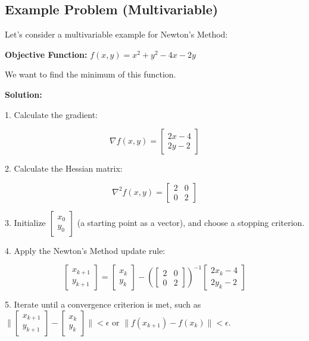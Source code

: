 \documentclass[a4paper]{article}
\begin{document}
\subsection{Example Problem (Multivariable)}

Let's consider a multivariable example for Newton's Method:

\textbf{Objective Function:} $f(x, y) = x^2 + y^2 - 4x - 2y$

We want to find the minimum of this function.

\textbf{Solution:}

1. Calculate the gradient:

\[
\nabla f(x, y) = \begin{bmatrix}
2x - 4 \\
2y - 2
\end{bmatrix}
\]

2. Calculate the Hessian matrix:

\[
\nabla^2 f(x, y) = \begin{bmatrix}
2 & 0 \\
0 & 2
\end{bmatrix}
\]

3. Initialize $\begin{bmatrix} x_0 \\ y_0 \end{bmatrix}$ (a starting point as a vector), and choose a stopping criterion.

4. Apply the Newton's Method update rule:

\[
\begin{bmatrix} x_{k+1} \\ y_{k+1} \end{bmatrix}
=
\begin{bmatrix} x_k \\ y_k \end{bmatrix}
-
\left(
\begin{bmatrix}
2 & 0 \\
0 & 2
\end{bmatrix}
\right)^{-1}
\begin{bmatrix}
2x_k - 4 \\
2y_k - 2
\end{bmatrix}
\]

5. Iterate until a convergence criterion is met, such as $\| \begin{bmatrix} x_{k+1} \\ y_{k+1} \end{bmatrix} - \begin{bmatrix} x_k \\ y_k \end{bmatrix} \| < \epsilon$ or $\| f(x_{k+1}) - f(x_k) \| < \epsilon$.
\end{document}
